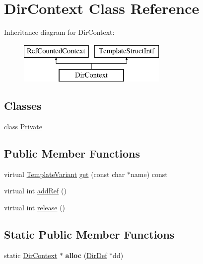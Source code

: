 \hypertarget{class_dir_context}{}\section{Dir\+Context Class Reference}
\label{class_dir_context}
Inheritance diagram for Dir\+Context\+:\begin{figure}[H]
\begin{center}
\leavevmode
\includegraphics[height=2.000000cm]{class_dir_context}
\end{center}
\end{figure}
\subsection*{Classes}
\begin{DoxyCompactItemize}
\item 
class \mbox{\hyperlink{class_dir_context_1_1_private}{Private}}
\end{DoxyCompactItemize}
\subsection*{Public Member Functions}
\begin{DoxyCompactItemize}
\item 
virtual \mbox{\hyperlink{class_template_variant}{Template\+Variant}} \mbox{\hyperlink{class_dir_context_a3387722406ca015b5dabe220dfbed4b6}{get}} (const char $\ast$name) const
\item 
virtual int \mbox{\hyperlink{class_dir_context_aed347462a6216f09bf1ca609e1cc9c1a}{add\+Ref}} ()
\item 
virtual int \mbox{\hyperlink{class_dir_context_aa32fa4e75b13432c9dc8d42d5e8d6cad}{release}} ()
\end{DoxyCompactItemize}
\subsection*{Static Public Member Functions}
\begin{DoxyCompactItemize}
\item 
\mbox{\label{class_dir_context_af45e135e3ee37b65c81823b610253f82}} 
static \mbox{\hyperlink{class_dir_context}{Dir\+Context}} $\ast$ {\bfseries alloc} (\mbox{\hyperlink{class_dir_def}{Dir\+Def}} $\ast$dd)
\end{DoxyCompactItemize}



